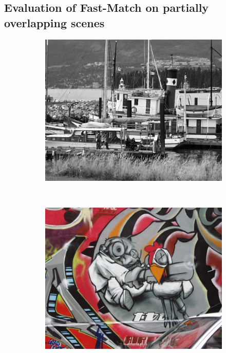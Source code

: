 \documentclass[10pt,twocolumn,letterpaper]{article}
\begin{document}
\subsection{Evaluation of Fast-Match on partially overlapping scenes}
\label{patches}
%
\begin{figure}[htb]
    \centering
    \begin{subfigure}[t]{0.20\columnwidth}
        \centering
        \includegraphics[width=1\columnwidth]{images/acr/boat1}
    \end{subfigure}%
    ~ %
    \begin{subfigure}[t]{0.20\columnwidth}
        \centering
        \includegraphics[width=1\columnwidth]{images/acr/graf1}

\end{subfigure}
\end{figure}
\end{document}
